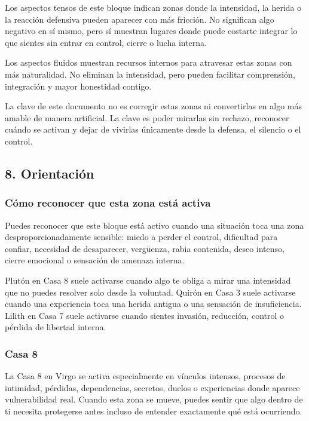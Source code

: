 \documentclass[11pt,a4paper]{article}
\begin{document}
Los aspectos tensos de este bloque indican zonas donde la intensidad, la herida o la reacción defensiva pueden aparecer con más fricción. No significan algo negativo en sí mismo, pero sí muestran lugares donde puede costarte integrar lo que sientes sin entrar en control, cierre o lucha interna.

Los aspectos fluidos muestran recursos internos para atravesar estas zonas con más naturalidad. No eliminan la intensidad, pero pueden facilitar comprensión, integración y mayor honestidad contigo.

La clave de este documento no es corregir estas zonas ni convertirlas en algo más amable de manera artificial. La clave es poder mirarlas sin rechazo, reconocer cuándo se activan y dejar de vivirlas únicamente desde la defensa, el silencio o el control.

\vspace{0.8cm}

\subsection{8. Orientación}

\subsubsection*{Cómo reconocer que esta zona está activa}
Puedes reconocer que este bloque está activo cuando una situación toca una zona desproporcionadamente sensible: miedo a perder el control, dificultad para confiar, necesidad de desaparecer, vergüenza, rabia contenida, deseo intenso, cierre emocional o sensación de amenaza interna.

Plutón en Casa 8 suele activarse cuando algo te obliga a mirar una intensidad que no puedes resolver solo desde la voluntad. Quirón en Casa 3 suele activarse cuando una experiencia toca una herida antigua o una sensación de insuficiencia. Lilith en Casa 7 suele activarse cuando sientes invasión, reducción, control o pérdida de libertad interna.

\subsubsection*{Casa 8}
La Casa 8 en Virgo se activa especialmente en vínculos intensos, procesos de intimidad, pérdidas, dependencias, secretos, duelos o experiencias donde aparece vulnerabilidad real. Cuando esta zona se mueve, puedes sentir que algo dentro de ti necesita protegerse antes incluso de entender exactamente qué está ocurriendo.
\end{document}
